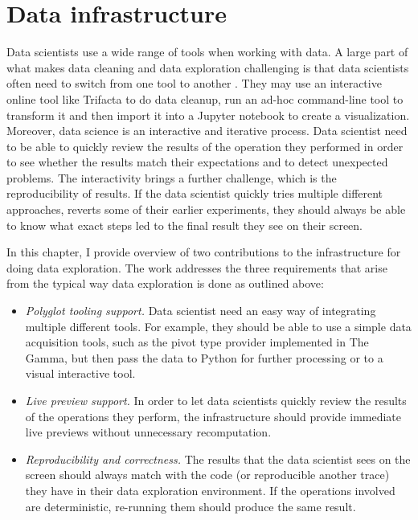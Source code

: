 \documentclass[fleqn,11pt]{report}
\theoremstyle{definition}
\newenvironment{nitemize}
{ \vspace{-0.4em}
  \begin{itemize}
    \setlength{\itemsep}{5pt}
    \setlength{\parskip}{0pt}
    \setlength{\parsep}{0pt} }
{ \end{itemize}
  \vspace{-0.4em} }
\begin{document}

\chapter{Data infrastructure}
\label{ch:infra}

Data scientists use a wide range of tools when working with data. A large part of what makes
data cleaning and data exploration challenging is that data scientists often need to switch
from one tool to another \citep{rattenbury-2017-wrangling}. They may use an interactive online
tool like Trifacta to do data cleanup, run an ad-hoc command-line tool to
transform it and then import it into a Jupyter notebook to create a visualization. Moreover,
data science is an interactive and iterative process. Data scientist need to be able to quickly
review the results of the operation they performed in order to see whether the results match
their expectations and to detect unexpected problems. The interactivity brings a further challenge,
which is the reproducibility of results. If the data scientist quickly tries multiple different
approaches, reverts some of their earlier experiments, they should always be able to know what
exact steps led to the final result they see on their screen.

In this chapter, I provide overview of two contributions to the infrastructure for doing data
exploration. The work addresses the three requirements that arise from the typical way data
exploration is done as outlined above:

\begin{nitemize}
\item \emph{Polyglot tooling support.} Data scientist need an easy way of integrating multiple
  different tools. For example, they should be able to use a simple data acquisition tools,
  such as the pivot type provider implemented in The Gamma, but then pass the data to Python
  for further processing or to a visual interactive tool.

\item \emph{Live preview support.} In order to let data scientists quickly review the results
  of the operations they perform, the infrastructure should provide immediate live previews
  without unnecessary recomputation.

\item \emph{Reproducibility and correctness.} The results that the data scientist sees on the
  screen should always match with the code (or reproducible another trace) they have in their
  data exploration environment. If the operations involved are deterministic, re-running them
  should produce the same result.
\end{nitemize}
\end{document}
